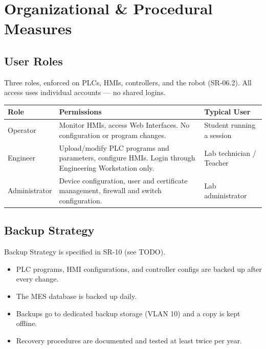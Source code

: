 \section{Organizational \& Procedural Measures}

\subsection{User Roles}
Three roles, enforced on PLCs, HMIs, controllers, and the robot (SR-06.2). All access uses individual accounts — no shared logins. \\

\renewcommand{\arraystretch}{1.3} %
\begin{tabularx}{\textwidth}{p{2.5cm} X X}
    \textbf{Role} & \textbf{Permissions} & \textbf{Typical User} \vspace{0.5em}\\
\toprule
    Operator & Monitor HMIs, access Web Interfaces. No configuration or program changes. & Student running a session \\
    \midrule
    Engineer & Upload/modify PLC programs and parameters, configure HMIs. Login through Engineering Workstation only. & Lab technician / Teacher \\
    \midrule
    Administrator &  Device configuration, user and certificate management, firewall and switch configuration. &  Lab administrator \\
    \bottomrule
\end{tabularx}
\vspace{1em}

\subsection{Backup Strategy}
Backup Strategy is specified in SR-10 (see TODO).

\begin{itemize}
    \item PLC programs, HMI configurations, and controller configs are backed up after every change.
    \item The MES database is backed up daily.
    \item Backups go to dedicated backup storage (VLAN 10) and a copy is kept offline.
    \item Recovery procedures are documented and tested at least twice per year.
\end{itemize}

